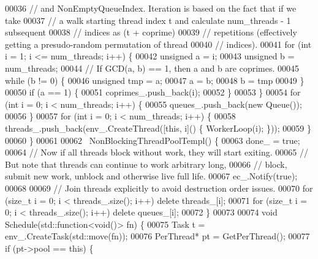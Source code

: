 \begin{DoxyCode}
00036     \textcolor{comment}{// and NonEmptyQueueIndex. Iteration is based on the fact that if we take}
00037     \textcolor{comment}{// a walk starting thread index t and calculate num\_threads - 1 subsequent}
00038     \textcolor{comment}{// indices as (t + coprime) %
00039     \textcolor{comment}{// repetitions (effectively getting a presudo-random permutation of thread}
00040     \textcolor{comment}{// indices).}
00041     \textcolor{keywordflow}{for} (\textcolor{keywordtype}{int} i = 1; i <= num\_threads; i++) \{
00042       \textcolor{keywordtype}{unsigned} a = i;
00043       \textcolor{keywordtype}{unsigned} b = num\_threads;
00044       \textcolor{comment}{// If GCD(a, b) == 1, then a and b are coprimes.}
00045       \textcolor{keywordflow}{while} (b != 0) \{
00046         \textcolor{keywordtype}{unsigned} tmp = a;
00047         a = b;
00048         b = tmp %
00049       \}
00050       \textcolor{keywordflow}{if} (a == 1) \{
00051         coprimes\_.push\_back(i);
00052       \}
00053     \}
00054     \textcolor{keywordflow}{for} (\textcolor{keywordtype}{int} i = 0; i < num\_threads; i++) \{
00055       queues\_.push\_back(\textcolor{keyword}{new} Queue());
00056     \}
00057     \textcolor{keywordflow}{for} (\textcolor{keywordtype}{int} i = 0; i < num\_threads; i++) \{
00058       threads\_.push\_back(env\_.CreateThread([\textcolor{keyword}{this}, i]() \{ WorkerLoop(i); \}));
00059     \}
00060   \}
00061 
00062   ~NonBlockingThreadPoolTempl() \{
00063     done\_ = \textcolor{keyword}{true};
00064     \textcolor{comment}{// Now if all threads block without work, they will start exiting.}
00065     \textcolor{comment}{// But note that threads can continue to work arbitrary long,}
00066     \textcolor{comment}{// block, submit new work, unblock and otherwise live full life.}
00067     ec\_.Notify(\textcolor{keyword}{true});
00068 
00069     \textcolor{comment}{// Join threads explicitly to avoid destruction order issues.}
00070     \textcolor{keywordflow}{for} (\textcolor{keywordtype}{size\_t} i = 0; i < threads\_.size(); i++) \textcolor{keyword}{delete} threads\_[i];
00071     \textcolor{keywordflow}{for} (\textcolor{keywordtype}{size\_t} i = 0; i < threads\_.size(); i++) \textcolor{keyword}{delete} queues\_[i];
00072   \}
00073 
00074   \textcolor{keywordtype}{void} Schedule(std::function<\textcolor{keywordtype}{void}()> fn) \{
00075     Task t = env\_.CreateTask(std::move(fn));
00076     PerThread* pt = GetPerThread();
00077     \textcolor{keywordflow}{if} (pt->pool == \textcolor{keyword}{this}) \{
}
\end{DoxyCode}
